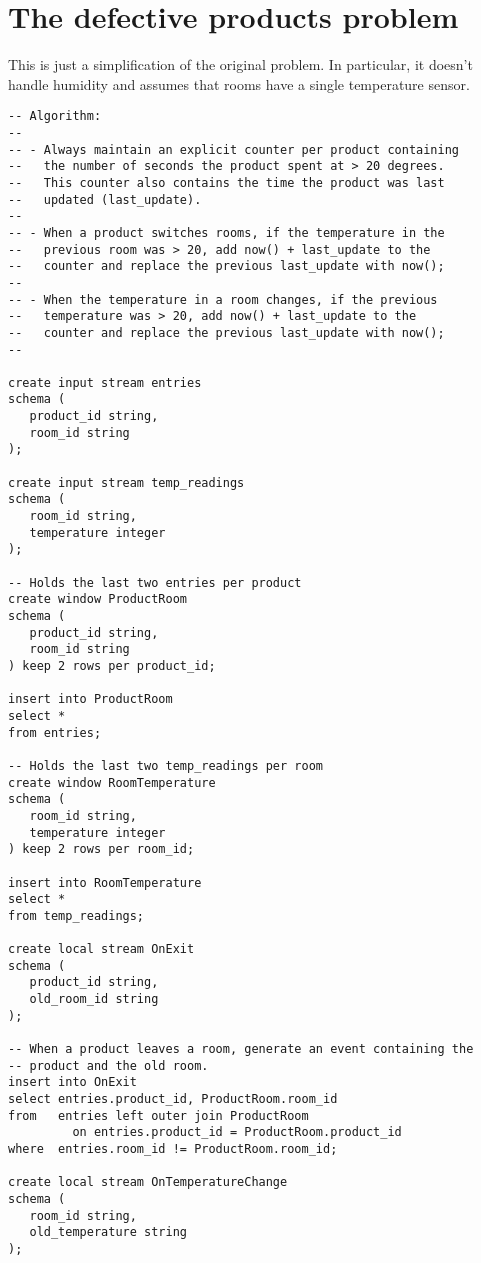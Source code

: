 \section{The defective products problem}
\label{sec:defective-products-solution}

This is just a simplification of the original problem. In particular,
it doesn't handle humidity and assumes that rooms have a single
temperature sensor.

\begin{lstlisting}
-- Algorithm:
--
-- - Always maintain an explicit counter per product containing
--   the number of seconds the product spent at > 20 degrees.
--   This counter also contains the time the product was last
--   updated (last_update).
--
-- - When a product switches rooms, if the temperature in the
--   previous room was > 20, add now() + last_update to the
--   counter and replace the previous last_update with now();
--
-- - When the temperature in a room changes, if the previous
--   temperature was > 20, add now() + last_update to the
--   counter and replace the previous last_update with now();
--

create input stream entries
schema (
   product_id string,
   room_id string
);

create input stream temp_readings
schema (
   room_id string,
   temperature integer
);

-- Holds the last two entries per product
create window ProductRoom
schema (
   product_id string,
   room_id string
) keep 2 rows per product_id;

insert into ProductRoom
select *
from entries;

-- Holds the last two temp_readings per room
create window RoomTemperature
schema (
   room_id string,
   temperature integer
) keep 2 rows per room_id;

insert into RoomTemperature
select *
from temp_readings;

create local stream OnExit
schema (
   product_id string,
   old_room_id string
);

-- When a product leaves a room, generate an event containing the
-- product and the old room.
insert into OnExit
select entries.product_id, ProductRoom.room_id
from   entries left outer join ProductRoom
         on entries.product_id = ProductRoom.product_id
where  entries.room_id != ProductRoom.room_id;

create local stream OnTemperatureChange
schema (
   room_id string,
   old_temperature string
);


\end{lstlisting}
